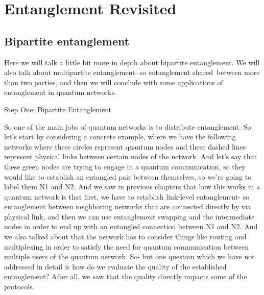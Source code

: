 \chapter{Entanglement Revisited}

\section{Bipartite entanglement}


Here we will talk a little bit more in depth about bipartite entanglement. We will also talk about multipartite entanglement- so entanglement shared between more than two parties, and then we will conclude with some applications of entanglement in quantum networks.

Step One: Bipartite Entanglement

So one of the main jobs of quantum networks is to distribute entanglement. So let's start by considering a concrete example, where we have the following networks where these circles represent quantum nodes and these dashed lines represent physical links between certain nodes of the network. And let's say that these green nodes are trying to engage in a quantum communication, so they would like to establish an entangled pair between themselves, so we're going to label them N1 and N2. And we saw in previous chapters that how this works in a quantum network is that first, we have to establish link-level entanglement- so entanglement between neighboring networks that are connected directly by via physical link, and then we can use entanglement swapping and the intermediate nodes in order to end up with an entangled connection between N1 and N2. And we also talked about that the network has to consider things like routing and multiplexing in order to satisfy the need for quantum communication between multiple users of the quantum network. So- but one question which we have not addressed in detail is how do we evaluate the quality of the established entanglement? After all, we saw that the quality directly impacts some of the protocols.

